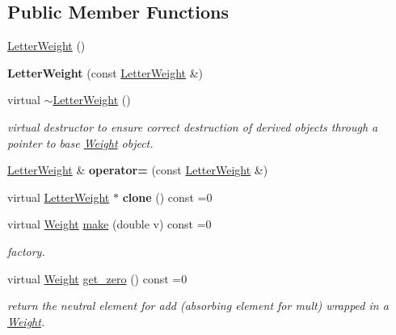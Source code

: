 \subsection*{Public Member Functions}
\begin{DoxyCompactItemize}
\item 
\mbox{\hyperlink{classLetterWeight_a2f9af55d38b8e7fd73af6cbbcb50971c}{Letter\+Weight}} ()
\item 
\mbox{\label{classLetterWeight_adaab28cd9be9b7ef9164bf3b33c58815}} 
{\bfseries Letter\+Weight} (const \mbox{\hyperlink{classLetterWeight}{Letter\+Weight}} \&)
\item 
\mbox{\label{classLetterWeight_a953daf9c03224b05f6e4deae78100e53}} 
virtual \mbox{\hyperlink{classLetterWeight_a953daf9c03224b05f6e4deae78100e53}{$\sim$\+Letter\+Weight}} ()
\begin{DoxyCompactList}\small\item\em virtual destructor to ensure correct destruction of derived objects through a pointer to base \mbox{\hyperlink{classWeight}{Weight}} object. \end{DoxyCompactList}\item 
\mbox{\label{classLetterWeight_a5f8b1c03c2f08be2728ee7638b5cee3d}} 
\mbox{\hyperlink{classLetterWeight}{Letter\+Weight}} \& {\bfseries operator=} (const \mbox{\hyperlink{classLetterWeight}{Letter\+Weight}} \&)
\item 
\mbox{\label{classLetterWeight_a23cdcf32e0f0782dbb33b2a65cf9de77}} 
virtual \mbox{\hyperlink{classLetterWeight}{Letter\+Weight}} $\ast$ {\bfseries clone} () const =0
\item 
virtual \mbox{\hyperlink{classWeight}{Weight}} \mbox{\hyperlink{classLetterWeight_af1f898e0845f59299440fc50a58fd2f1}{make}} (double v) const =0
\begin{DoxyCompactList}\small\item\em factory. \end{DoxyCompactList}\item 
\mbox{\label{classLetterWeight_a5caa3123e7b1ac3369c30e33f511a554}} 
virtual \mbox{\hyperlink{classWeight}{Weight}} \mbox{\hyperlink{classLetterWeight_a5caa3123e7b1ac3369c30e33f511a554}{get\+\_\+zero}} () const =0
\begin{DoxyCompactList}\small\item\em return the neutral element for add (absorbing element for mult) wrapped in a \mbox{\hyperlink{classWeight}{Weight}}. \end{DoxyCompactList}\item 

\end{DoxyCompactItemize}
